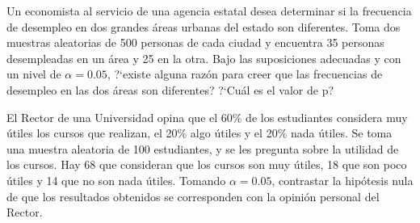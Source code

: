 
\begin{prob}%
    Un economista al servicio de una agencia estatal desea determinar
    si la frecuencia de desempleo en dos grandes \'areas urbanas del
    estado son diferentes. Toma dos muestras aleatorias de 500
    personas de cada ciudad y encuentra 35 personas desempleadas en
    un \'area y 25 en la otra. Bajo las suposiciones adecuadas y con
    un nivel de $\alpha = 0.05$, ?`existe alguna raz\'on para creer
    que las frecuencias de desempleo en las dos \'areas son
    diferentes? ?`Cu\'al es el valor de p?
\end{prob}

\begin{prob}%
    El Rector de una Universidad opina que el 60\% de los estudiantes
    con\-si\-de\-ra muy \'{u}tiles los cursos que realizan, el 20\% algo
    \'{u}tiles y el 20\% nada \'{u}tiles. Se toma una muestra aleatoria de
    100 estudiantes, y se les pregunta sobre la utilidad de los cursos. Hay
    68 que consideran que los cursos son muy \'{u}tiles, 18 que son poco
    \'{u}tiles y 14 que no son nada \'{u}tiles. Tomando $\alpha = 0.05$,
    contrastar la hip\'otesis nula de que los resultados obtenidos se
    corresponden con la opini\'{o}n personal del Rector.
\end{prob}

